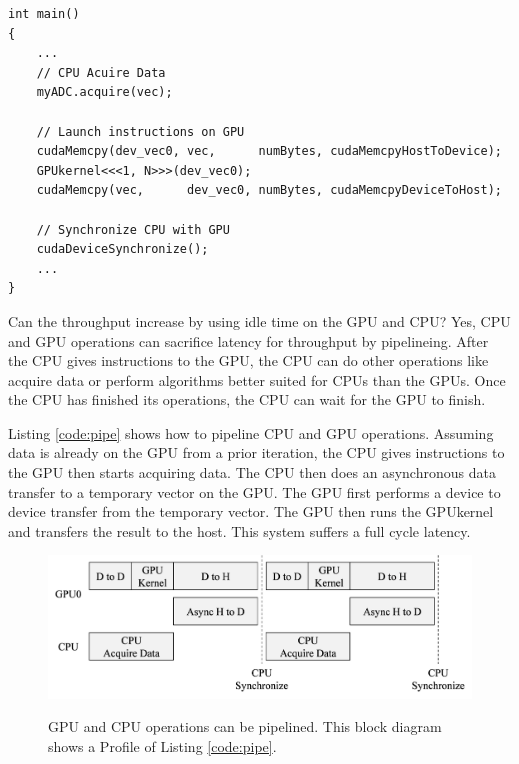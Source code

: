 \clearpage
\singlespacing
\begin{lstlisting}[style=myCUDAstyle,caption={Example code Simple example of the CPU acquiring data from myADC, copying from host to device, processing data on the device then copying from device to host. No processing occurs on device while CPU is acquiring data.},label={code:noPipe}]
int main()
{
	...
	// CPU Acuire Data
	myADC.acquire(vec);
	
	// Launch instructions on GPU 
	cudaMemcpy(dev_vec0, vec,      numBytes, cudaMemcpyHostToDevice);
	GPUkernel<<<1, N>>>(dev_vec0);
	cudaMemcpy(vec,      dev_vec0, numBytes, cudaMemcpyDeviceToHost);
	
	// Synchronize CPU with GPU
	cudaDeviceSynchronize();
	...
}
\end{lstlisting}
\doublespacing

Can the throughput increase by using idle time on the GPU and CPU?
Yes, CPU and GPU operations can sacrifice latency for throughput by pipelineing.
After the CPU gives instructions to the GPU, the CPU can do other operations like acquire data or perform algorithms better suited for CPUs than the GPUs.
Once the CPU has finished its operations, the CPU can wait for the GPU to finish.

Listing \ref{code:pipe} shows how to pipeline CPU and GPU operations.
Assuming data is already on the GPU from a prior iteration, the CPU gives instructions to the GPU then starts acquiring data.
The CPU then does an asynchronous data transfer to a temporary vector on the GPU.
The GPU first performs a device to device transfer from the temporary vector.
The GPU then runs the GPUkernel and transfers the result to the host.
This system suffers a full cycle latency.
\begin{figure}
	\caption{GPU and CPU operations can be pipelined. This block diagram shows a Profile of Listing \ref{code:pipe}.}
	\centering\includegraphics[width=9.97in/100*55]{figures/gpu_intro/concurrentCPU_blocking.pdf}
	\label{fig:concurrentCPU_blocking}
\end{figure}

